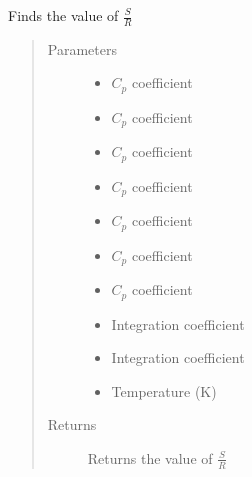 \documentclass[letterpaper,10pt,english]{sphinxmanual}
\begin{document}
\begin{fulllineitems}
Finds the value of \(\frac{S}{R}\)
\begin{quote}\begin{description}
\item[{Parameters}] \leavevmode\begin{itemize}
\item {} 
 \textendash{} \(C_p\) coefficient

\item {} 
 \textendash{} \(C_p\) coefficient

\item {} 
 \textendash{} \(C_p\) coefficient

\item {} 
 \textendash{} \(C_p\) coefficient

\item {} 
 \textendash{} \(C_p\) coefficient

\item {} 
 \textendash{} \(C_p\) coefficient

\item {} 
 \textendash{} \(C_p\) coefficient

\item {} 
 \textendash{} Integration coefficient

\item {} 
 \textendash{} Integration coefficient

\item {} 
 \textendash{} Temperature (K)

\end{itemize}

\item[{Returns}] \leavevmode
Returns the value of \(\frac{S}{R}\)

\end{description}\end{quote}

\end{fulllineitems}
\end{document}
